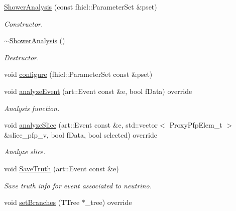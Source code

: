 \begin{DoxyCompactItemize}
\item 
\hyperlink{classanalysis_1_1ShowerAnalysis_a6ea40aa403312ba7acc5434c1c66df63}{Shower\+Analysis} (const fhicl\+::\+Parameter\+Set \&pset)
\begin{DoxyCompactList}\small\item\em Constructor. \end{DoxyCompactList}\item 
\hyperlink{classanalysis_1_1ShowerAnalysis_af16c1759f0122ba30f7839c4003c0df7}{$\sim$\+Shower\+Analysis} ()\hypertarget{classanalysis_1_1ShowerAnalysis_af16c1759f0122ba30f7839c4003c0df7}{}\label{classanalysis_1_1ShowerAnalysis_af16c1759f0122ba30f7839c4003c0df7}

\begin{DoxyCompactList}\small\item\em Destructor. \end{DoxyCompactList}\item 
void \hyperlink{classanalysis_1_1ShowerAnalysis_a973cb90e6fa423b88ca3a9667d467b1e}{configure} (fhicl\+::\+Parameter\+Set const \&pset)
\item 
void \hyperlink{classanalysis_1_1ShowerAnalysis_a5ae15109590ea737320bf13cefa5cc3f}{analyze\+Event} (art\+::\+Event const \&e, bool f\+Data) override
\begin{DoxyCompactList}\small\item\em Analysis function. \end{DoxyCompactList}\item 
void \hyperlink{classanalysis_1_1ShowerAnalysis_a957be06c08e5777cd684c84ca53bc45e}{analyze\+Slice} (art\+::\+Event const \&e, std\+::vector$<$ Proxy\+Pfp\+Elem\+\_\+t $>$ \&slice\+\_\+pfp\+\_\+v, bool f\+Data, bool selected) override\hypertarget{classanalysis_1_1ShowerAnalysis_a957be06c08e5777cd684c84ca53bc45e}{}\label{classanalysis_1_1ShowerAnalysis_a957be06c08e5777cd684c84ca53bc45e}

\begin{DoxyCompactList}\small\item\em Analyze slice. \end{DoxyCompactList}\item 
void \hyperlink{classanalysis_1_1ShowerAnalysis_a0753806916baaf34f1ab0efa0dc4f4cc}{Save\+Truth} (art\+::\+Event const \&e)\hypertarget{classanalysis_1_1ShowerAnalysis_a0753806916baaf34f1ab0efa0dc4f4cc}{}\label{classanalysis_1_1ShowerAnalysis_a0753806916baaf34f1ab0efa0dc4f4cc}

\begin{DoxyCompactList}\small\item\em Save truth info for event associated to neutrino. \end{DoxyCompactList}\item 
void \hyperlink{classanalysis_1_1ShowerAnalysis_a007102f8d6c1f72551124b35b846662d}{set\+Branches} (T\+Tree $\ast$\+\_\+tree) override\hypertarget{classanalysis_1_1ShowerAnalysis_a007102f8d6c1f72551124b35b846662d}{}\label{classanalysis_1_1ShowerAnalysis_a007102f8d6c1f72551124b35b846662d}


\end{DoxyCompactItemize}
